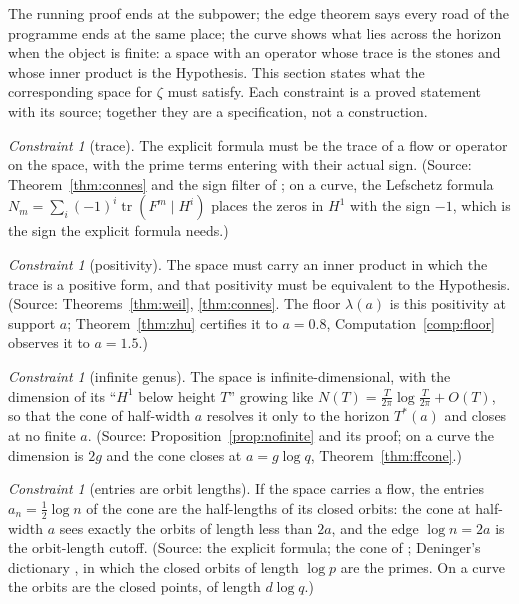 \documentclass[11pt]{article}
\theoremstyle{definition}
\theoremstyle{remark}
\newtheorem{constraint}[theorem]{Constraint}
\newcommand{\Tst}{T^{*}}
\begin{document}
The running proof ends at the subpower; the edge theorem says every road of the programme ends at the same place; the curve shows what lies across the horizon when the object is finite: a space with an operator whose trace is the stones and whose inner product is the Hypothesis. This section states what the corresponding space for $\zeta$ must satisfy. Each constraint is a proved statement with its source; together they are a specification, not a construction.

\begin{constraint}[trace]\label{c:trace}
The explicit formula must be the trace of a flow or operator on the space, with the prime terms entering with their actual sign. (Source: Theorem~\ref{thm:connes} and the sign filter of \cite{routes}; on a curve, the Lefschetz formula $N_m=\sum_i(-1)^i\operatorname{tr}(F^m\mid H^i)$ places the zeros in $H^1$ with the sign $-1$, which is the sign the explicit formula needs.)
\end{constraint}

\begin{constraint}[positivity]\label{c:pos}
The space must carry an inner product in which the trace is a positive form, and that positivity must be equivalent to the Hypothesis. (Source: Theorems~\ref{thm:weil}, \ref{thm:connes}. The floor $\lambda(a)$ is this positivity at support $a$; Theorem~\ref{thm:zhu} certifies it to $a=0.8$, Computation~\ref{comp:floor} observes it to $a=1.5$.)
\end{constraint}

\begin{constraint}[infinite genus]\label{c:dim}
The space is infinite-dimensional, with the dimension of its ``$H^1$ below height $T$'' growing like $N(T)=\frac T{2\pi}\log\frac T{2\pi}+O(T)$, so that the cone of half-width $a$ resolves it only to the horizon $\Tst(a)$ and closes at no finite $a$. (Source: Proposition~\ref{prop:nofinite} and its proof; on a curve the dimension is $2g$ and the cone closes at $a=g\log q$, Theorem~\ref{thm:ffcone}.)
\end{constraint}

\begin{constraint}[entries are orbit lengths]\label{c:orbits}
If the space carries a flow, the entries $a_n=\tfrac12\log n$ of the cone are the half-lengths of its closed orbits: the cone at half-width $a$ sees exactly the orbits of length less than $2a$, and the edge $\log n=2a$ is the orbit-length cutoff. (Source: the explicit formula; the cone of \cite[\S12]{folds}; Deninger's dictionary \cite{deninger}, in which the closed orbits of length $\log p$ are the primes. On a curve the orbits are the closed points, of length $d\log q$.)
\end{constraint}
\end{document}
